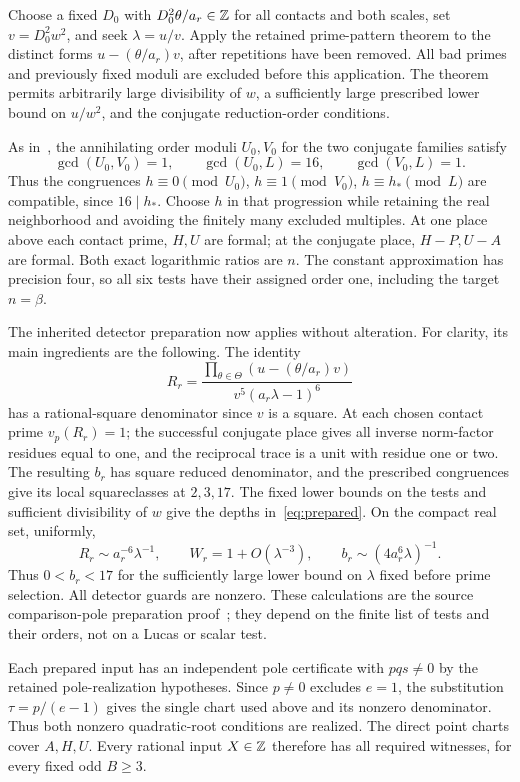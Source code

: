 \documentclass[11pt,a4paper]{article}
\begin{document}
Choose a fixed $D_0$ with $D_0^2\theta/a_r\in\mathbb Z$ for all
contacts and both scales, set $v=D_0^2w^2$, and seek
$\lambda=u/v$. Apply the retained prime-pattern theorem to
the distinct forms $u-(\theta/a_r)v$, after repetitions have
been removed. All bad primes and previously fixed moduli are
excluded before this application. The theorem permits arbitrarily
large divisibility of $w$, a sufficiently large prescribed lower
bound on $u/w^2$, and the conjugate reduction-order conditions.

As in~\cite{Dependencies,Baseline}, the annihilating order moduli
$U_0,V_0$ for the two conjugate families satisfy
\[
 \gcd(U_0,V_0)=1,\qquad \gcd(U_0,L)=16,\qquad\gcd(V_0,L)=1.
\]
Thus the congruences
$h\equiv0\pmod{U_0}$, $h\equiv1\pmod{V_0}$,
$h\equiv h_*\pmod L$ are compatible, since $16\mid h_*$.
Choose $h$ in that
progression while retaining the real neighborhood and avoiding
the finitely many excluded multiples. At one place above each
contact prime, $H,U$ are formal; at the conjugate place,
$H-P,U-A$ are formal. Both exact logarithmic ratios are $n$.
The constant approximation has precision four, so all six tests
have their assigned order one, including the target $n=\beta$.

The inherited detector preparation now applies without alteration.
For clarity, its main ingredients are the following. The identity
\[
 R_r=\frac{\prod_{\theta\in\Theta}(u-(\theta/a_r)v)}
                  {v^5(a_r\lambda-1)^6}
\]
has a rational-square denominator since $v$ is a square.
At each chosen contact prime $v_p(R_r)=1$; the successful
conjugate place gives all inverse norm-factor residues equal to
one, and the reciprocal trace is a unit with residue one or two.
The resulting $b_r$ has square reduced denominator, and the
prescribed congruences give its local squareclasses at $2,3,17$.
The fixed lower bounds on the tests and sufficient divisibility
of $w$ give the depths in~\eqref{eq:prepared}.
On the compact real set, uniformly,
\[
 R_r\sim a_r^{-6}\lambda^{-1},\qquad
 W_r=1+O(\lambda^{-3}),\qquad
 b_r\sim(4a_r^6\lambda)^{-1}.
\]
Thus $0<b_r<17$ for the sufficiently large lower bound on
$\lambda$ fixed before prime selection. All detector guards
are nonzero. These calculations are the source comparison-pole
preparation proof~\cite{Baseline}; they depend on the finite
list of tests and their orders, not on a Lucas or scalar test.

Each prepared input has an independent pole certificate with
$pqs\ne0$ by the retained pole-realization hypotheses.
Since $p\ne0$ excludes $e=1$, the substitution
$\tau=p/(e-1)$ gives the single chart used above and its
nonzero denominator. Thus both nonzero quadratic-root conditions
are realized. The direct point charts cover $A,H,U$.
Every rational input $X\in\mathbb Z$ therefore has all required
witnesses, for every fixed odd $B\ge3$.
\end{document}
